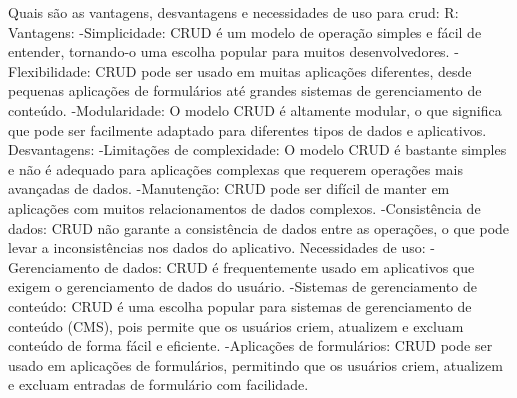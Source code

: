 Quais são as vantagens, desvantagens e necessidades de uso para crud:
R:
Vantagens:
  -Simplicidade: CRUD é um modelo de operação simples e fácil de entender, tornando-o uma escolha popular para muitos desenvolvedores.
  -Flexibilidade: CRUD pode ser usado em muitas aplicações diferentes, desde pequenas aplicações de formulários até grandes sistemas de gerenciamento de conteúdo.
  -Modularidade: O modelo CRUD é altamente modular, o que significa que pode ser facilmente adaptado para diferentes tipos de dados e aplicativos.
Desvantagens:
  -Limitações de complexidade: O modelo CRUD é bastante simples e não é adequado para aplicações complexas que requerem operações mais avançadas de dados.
  -Manutenção: CRUD pode ser difícil de manter em aplicações com muitos relacionamentos de dados complexos.
  -Consistência de dados: CRUD não garante a consistência de dados entre as operações, o que pode levar a inconsistências nos dados do aplicativo.
Necessidades de uso:
  -Gerenciamento de dados: CRUD é frequentemente usado em aplicativos que exigem o gerenciamento de dados do usuário.
  -Sistemas de gerenciamento de conteúdo: CRUD é uma escolha popular para sistemas de gerenciamento de conteúdo (CMS), pois permite que os usuários criem, atualizem e excluam conteúdo de forma fácil e eficiente.
  -Aplicações de formulários: CRUD pode ser usado em aplicações de formulários, permitindo que os usuários criem, atualizem e excluam entradas de formulário com facilidade.